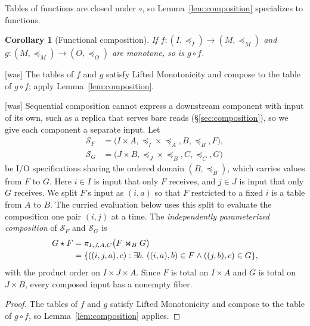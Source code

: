 \documentclass[sigconf]{cidr-2027}
\newtheorem{corollary}{Corollary}
\theoremstyle{remark}
\newcommand{\InputOrd}{\preceq_I}
\newcommand{\OutputOrd}{\preceq_O}
\newcommand{\Spec}{\mathcal{S}}
\newcommand{\spectype}[1][]{I/O specification#1\xspace}
\begin{document}
Tables of functions are closed under $\circ$, so Lemma~\ref{lem:composition}
specializes to functions.

\begin{corollary}[Functional composition]
\label{cor:functional-composition}
If $f:(I,\InputOrd)\to(M,\preceq_M)$ and
$g:(M,\preceq_M)\to(O,\OutputOrd)$ are monotone, so is $g\circ f$.
\end{corollary}



{\footnotesize\color{black!50}\noindent\textsf{[was]} The tables of $f$ and $g$ satisfy Lifted Monotonicity and compose to the
table of $g\circ f$; apply Lemma~\ref{lem:composition}.\par}



{\footnotesize\color{black!50}\noindent\textsf{[was]} Sequential composition cannot express a downstream component with input of
its own, such as a replica that serves bare reads
(\S\ref{sec:composition}), so we give each component a separate
input.  Let
\begin{align*}
  \Spec_F&=\bigl(I\times A,\preceq_I\times\preceq_A,B,\preceq_B,F\bigr),\\
  \Spec_G&=\bigl(J\times B,\preceq_J\times\preceq_B,C,\preceq_C,G\bigr)
\end{align*}
be \spectype[s] sharing the ordered domain
$(B,\preceq_B)$, which carries values from $F$ to $G$.  Here $i\in I$ is input
that only $F$ receives, and $j\in J$ is input that only $G$ receives.  We
split $F$'s input as $(i,a)$ so that $F$ restricted to a fixed $i$ is a table
from $A$ to $B$.  The curried evaluation below uses this split to evaluate
the composition one pair $(i,j)$ at a time.  The \emph{independently
parameterized composition} of $\Spec_F$ and $\Spec_G$ is
\begin{align}
  G\star F
  &=\pi_{I,J,A,C}\bigl(F\Join_{B}G\bigr) \notag\\
  &=\{((i,j,a),c):\exists b.\ ((i,a),b)\in F
                         \land ((j,b),c)\in G\},
\end{align}
with the product order on $I\times J\times A$.  Since $F$ is total on
$I\times A$ and $G$ is total on $J\times B$, every composed input has a
nonempty fiber.\par}

\color{blue!70!black}\begin{proof}
The tables of $f$ and $g$ satisfy Lifted Monotonicity and compose to the
table of $g\circ f$, so Lemma~\ref{lem:composition} applies.\color{black}
\end{proof}
\end{document}
